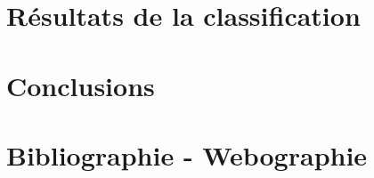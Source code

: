 \documentclass[pdftex,12pt,a4paper]{report}
\begin{document}
\begin{spacing}{1.2}
\chapter{Résultats de la classification}

\chapter{Conclusions}

\chapter*{Bibliographie - Webographie}

\end{spacing}
\end{document}
